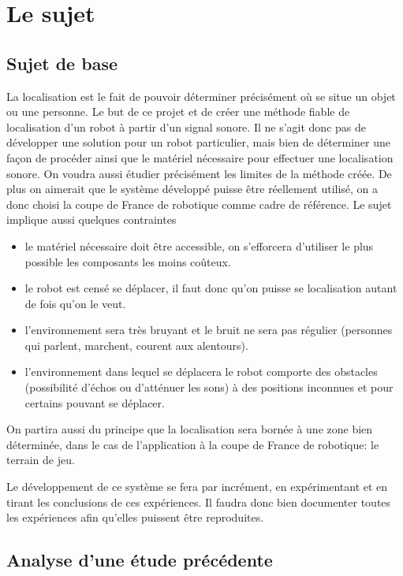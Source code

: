 \documentclass[12pt,a4paper]{report}
\begin{document}
\tableofcontents

\chapter{Le sujet}
\section{Sujet de base}
La localisation est le fait de pouvoir déterminer précisément où se situe un objet ou une personne. Le but de ce projet et de créer une méthode fiable de localisation d'un robot à partir d'un signal sonore. Il ne s'agit donc pas de développer une solution pour un robot particulier, mais bien de déterminer une façon de procéder ainsi que le matériel nécessaire pour effectuer une localisation sonore. On voudra aussi étudier précisément les limites de la méthode créée. De plus on aimerait que le système développé puisse être réellement utilisé, on a donc choisi la coupe de France de robotique comme cadre de référence. Le sujet implique aussi quelques contraintes
\begin{itemize}
\item le matériel nécessaire doit être accessible, on s'efforcera d'utiliser le plus possible les composants les moins coûteux.
\item le robot est censé se déplacer, il faut donc qu'on puisse se localisation autant de fois qu'on le veut.
\item l'environnement sera très bruyant et le bruit ne sera pas régulier (personnes qui parlent, marchent, courent aux alentours).
\item l'environnement dans lequel se déplacera le robot comporte des obstacles (possibilité d'échos ou d'atténuer les sons) à des positions inconnues et pour certains pouvant se déplacer.
\end{itemize}
On partira aussi du principe que la localisation sera bornée à une zone bien déterminée, dans le cas de l'application à la coupe de France de robotique: le terrain de jeu. 

Le développement de ce système se fera par incrément, en expérimentant et en tirant les conclusions de ces expériences. Il faudra donc bien documenter toutes les expériences afin qu'elles puissent être reproduites.

\section{Analyse d'une étude précédente}
\end{document}
